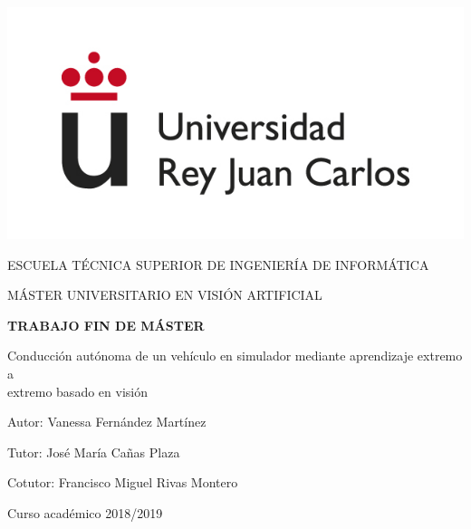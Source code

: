 \begin{titlepage}
	\begin{center}
		\vspace*{3mm}
		\begin{center}
			\includegraphics[width=0.4\linewidth]{figures/logo.jpg}
		\end{center}
		\vspace{6.5mm}
		
		\fontsize{15.5}{14}\selectfont ESCUELA TÉCNICA SUPERIOR DE INGENIERÍA DE INFORMÁTICA
		\vspace{13mm}
		
		\fontsize{14}{14}\selectfont MÁSTER UNIVERSITARIO EN VISIÓN ARTIFICIAL 
		
		\vspace{55pt}
		
		\fontsize{15.7}{14}\selectfont \textbf{TRABAJO FIN DE MÁSTER} 
		
		\vspace{20mm}
		\begin{huge}
			Conducción autónoma de un vehículo en \vspace{0.4cm} simulador mediante aprendizaje extremo a \\ \vspace{0.4cm} extremo basado en visión
		\end{huge}
		
		\vspace{20mm}
		
		\begin{large}
			Autor: Vanessa Fernández Martínez
			
			Tutor: José María Cañas Plaza
			
			Cotutor: Francisco Miguel Rivas Montero
			
			\vspace{10mm}
		\end{large}
		\begin{normalsize}
			Curso académico 2018/2019		
		\end{normalsize}
		\vspace{10mm}
		
	\end{center}
	
\end{titlepage}